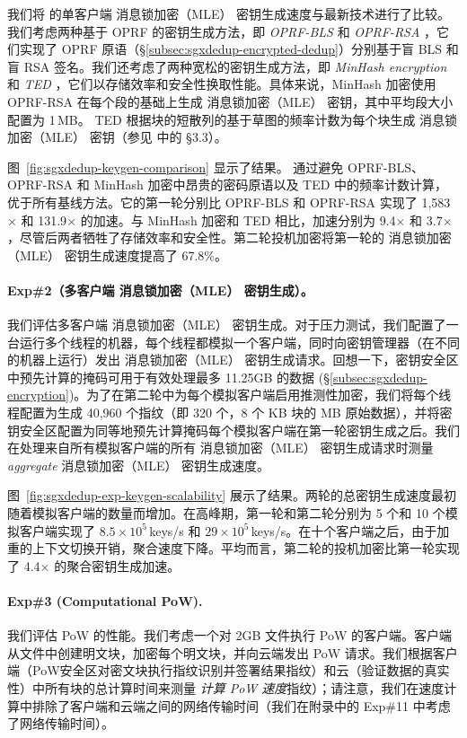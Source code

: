 我们将 \sysnameS 的单客户端 消息锁加密（MLE） 密钥生成速度与最新技术进行了比较。我们考虑两种基于 OPRF 的密钥生成方法，即 \textit{ OPRF-BLS} \cite{armknecht15} 和 \textit{ OPRF-RSA} \cite{bellare13b}，它们实现了 OPRF 原语（\S\ref{subsec:sgxdedup-encrypted-dedup}）分别基于盲 BLS 和盲 RSA 签名。我们还考虑了两种宽松的密钥生成方法，即 \textit{ MinHash encryption} \cite{qin17} 和 \textit{ TED} \cite{li20b}，它们以存储效率和安全性换取性能。具体来说，MinHash 加密使用 OPRF-RSA 在每个段的基础上生成 消息锁加密（MLE） 密钥，其中平均段大小配置为 1\,MB。 TED 根据块的短散列的基于草图的频率计数为每个块生成 消息锁加密（MLE） 密钥（参见 \cite{li20b} 中的 \S3.3）。

图~\ref{fig:sgxdedup-keygen-comparison} 显示了结果。 \sysnameS 通过避免 OPRF-BLS、OPRF-RSA 和 MinHash 加密中昂贵的密码原语以及 TED 中的频率计数计算，优于所有基线方法。它的第一轮分别比 OPRF-BLS 和 OPRF-RSA 实现了 1,583$\times$ 和 131.9$\times$ 的加速。与 MinHash 加密和 TED 相比，加速分别为 9.4$\times$ 和 3.7$\times$，尽管后两者牺牲了存储效率和安全性。第二轮投机加密将第一轮的 消息锁加密（MLE） 密钥生成速度提高了 67.8\%。



\paragraph*{Exp\#2（多客户端 消息锁加密（MLE） 密钥生成）。} 我们评估多客户端 消息锁加密（MLE） 密钥生成。对于压力测试，我们配置了一台运行多个线程的机器，每个线程都模拟一个客户端，同时向密钥管理器（在不同的机器上运行）发出 消息锁加密（MLE） 密钥生成请求。回想一下，密钥安全区中预先计算的掩码可用于有效处理最多 11.25GB 的数据 (\S\ref{subsec:sgxdedup-encryption})。为了在第二轮中为每个模拟客户端启用推测性加密，我们将每个线程配置为生成 40,960 个指纹（即 320 个，8 个 KB 块的 MB 原始数据），并将密钥安全区配置为同等地预先计算掩码每个模拟客户端在第一轮密钥生成之后。我们在处理来自所有模拟客户端的所有 消息锁加密（MLE） 密钥生成请求时测量 \textit{ aggregate} 消息锁加密（MLE） 密钥生成速度。

图~\ref{fig:sgxdedup-exp-keygen-scalability} 展示了结果。两轮的总密钥生成速度最初随着模拟客户端的数量而增加。在高峰期，第一轮和第二轮分别为 5 个和 10 个模拟客户端实现了 $8.5\times 10^5$\,keys/s 和 $29\times 10^5$\,keys/s。在十个客户端之后，由于加重的上下文切换开销，聚合速度下降。平均而言，第二轮的投机加密比第一轮实现了 4.4$\times$ 的聚合密钥生成加速。


\paragraph*{Exp\#3 (Computational PoW).} 我们评估 PoW 的性能。我们考虑一个对 2GB 文件执行 PoW 的客户端。客户端从文件中创建明文块，加密每个明文块，并向云端发出 PoW 请求。我们根据客户端（PoW安全区对密文块执行指纹识别并签署结果指纹）和云（验证数据的真实性）中所有块的总计算时间来测量 \textit{ 计算 PoW 速度}指纹）；请注意，我们在速度计算中排除了客户端和云端之间的网络传输时间（我们在附录中的 Exp\#11 中考虑了网络传输时间）。

